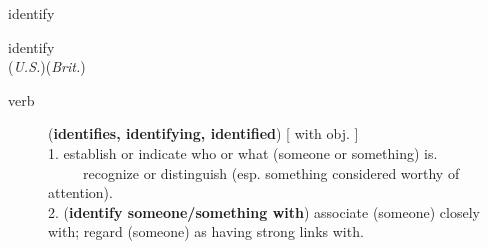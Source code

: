 \documentclass[avery5372, grid]{flashcards}
\begin{document}
\begin{flashcard}{\Huge identify}
	\begin{center}
		{\LARGE i\textbullet den\textbullet ti\textbullet fy}\\
		(\textit{U.S.})\hspace{0.25cm}(\textit{Brit.})
	\end{center}
	\begin{description}
		
		\item[verb] (\textbf{identifies, identifying, identified}) [ with obj. ]\\
			
			1.  establish or indicate who or what (someone or something) is.\\%
			\ \ \ \ \textbullet\  recognize or distinguish (esp. something considered worthy of attention).\\%
			
			2. (\textbf{identify someone/something with}) associate (someone) closely with; regard (someone) as having strong links with.\\%
			
		

\end{description}
\end{flashcard}
\end{document}
